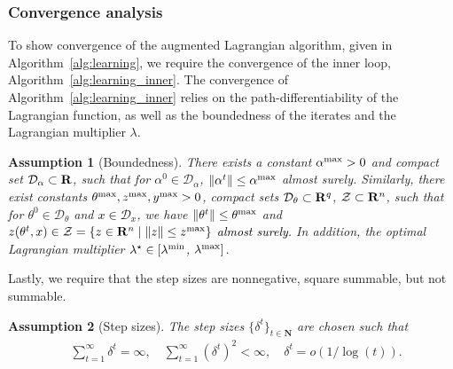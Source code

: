 \documentclass[11pt]{article}
\newtheorem{assumption}{Assumption}
\newtheorem{assumption}{Assumption}[section]
\newcommand{\bsnote}[1]{\noindent\textcolor{red}{\texttt{Bartolomeo: #1}}}
\newcommand{\RC}[1]{\textcolor{black}{#1}}
\begin{document}


\subsubsection{Convergence analysis}
\label{sec:convergence_analysis}
To show convergence of the augmented Lagrangian algorithm, given in Algorithm~\ref{alg:learning}, we require the convergence of the inner loop, Algorithm~\ref{alg:learning_inner}. 
The convergence of Algorithm~\ref{alg:learning_inner} relies on the path-differentiability of the Lagrangian function, as well as the boundedness of the iterates and the Lagrangian multiplier $\lambda$.
\begin{assumption}[Boundedness]
\label{ass:bounded}
There exists a constant $\alpha^{\rm max} > 0$ and compact set $\mathcal{D}_{\alpha} \subset {\mathbf R}$, such that for $\alpha^0 \in  \mathcal{D}_{\alpha}$, $\|\alpha^t\| \leq \alpha^{\rm max}$  almost surely.
Similarly, there exist constants $\theta^{\rm max},\RC{z^{\rm max}}, y^{\rm max} > 0$, compact sets $\mathcal{D}_{\theta} \subset {\mathbf R}^{q}$, \RC{$\mathcal{Z} \subset {\mathbf R}^n$}, such that for $\theta^0 \in \mathcal{D}_{\theta}$ and \RC{$x \in \mathcal{D}_x$}, we have $\|\theta^t\| \leq \theta^{\rm max}$ and \RC{$z(\theta^t,x) \in \mathcal{Z} = \{z \in {\mathbf R}^n \mid \|z\| \le z^{\rm max}\}$ almost surely.}
In addition, the optimal Lagrangian multiplier $\lambda^\star \in [\lambda^{\rm{min}}$, $\lambda^{\rm{max}}]$.
\end{assumption}
Lastly, we require that the step sizes are nonnegative, square summable, but not summable.
\begin{assumption}[Step sizes]
\label{ass:step_size}
The step sizes $\{\delta^t\}_{t \in \mathbf{N}}$ are chosen such that
\begin{align*}
   &\sum_{t=1}^\infty \delta^t = \infty, \quad \sum_{t=1}^\infty (\delta^t)^2 < \infty,\quad \delta^t = o(1/\log(t)).
\end{align*}
\end{assumption}
\end{document}
